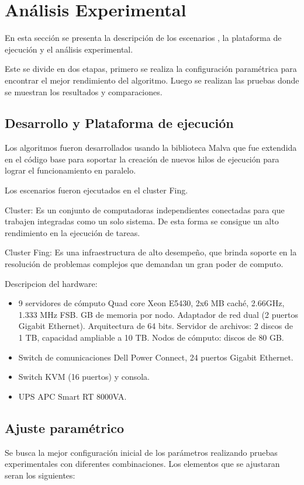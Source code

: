 \chapter{Análisis Experimental}
En esta sección se presenta la descripción de los escenarios , la plataforma de ejecución y el análisis experimental.

Este se divide en dos etapas, primero se realiza la configuración paramétrica para encontrar el mejor rendimiento del algoritmo. Luego se realizan las pruebas donde se muestran los resultados y comparaciones.


\section{Desarrollo y Plataforma de ejecución }
Los algoritmos fueron desarrollados usando la biblioteca Malva que fue extendida en el código base para soportar la creación de nuevos hilos de ejecución para lograr el funcionamiento en paralelo.

Los escenarios fueron ejecutados en el cluster Fing.

Cluster: Es un conjunto de computadoras independientes conectadas para que trabajen integradas como un solo sistema. De esta forma se consigue un alto rendimiento en la ejecución de tareas. 

Cluster Fing: Es una infraestructura de alto desempeño, que brinda soporte en la resolución de problemas complejos que demandan un gran poder de computo.

Descripcion del hardware: 
\begin{itemize}
	\item 9 servidores de cómputo
	\subitem Quad core Xeon E5430, 2x6 MB caché, 2.66GHz, 1.333 MHz FSB.
	 GB de memoria por nodo.
	\subitem Adaptador de red dual (2 puertos Gigabit Ethernet).
	\subitem  Arquitectura de 64 bits.
	\subitem Servidor de archivos: 2 discos de 1 TB, capacidad ampliable a 10 TB.
	\subitem Nodos de cómputo: discos de 80 GB.
	\item Switch de comunicaciones
	\subitem Dell Power Connect, 24 puertos Gigabit Ethernet.
	\item Switch KVM (16 puertos) y consola.
	\item UPS APC Smart RT 8000VA.
\end{itemize}

\section{Ajuste paramétrico}
Se busca la mejor configuración inicial de los parámetros realizando pruebas experimentales con diferentes combinaciones.  
Los elementos que se ajustaran seran los siguientes:

